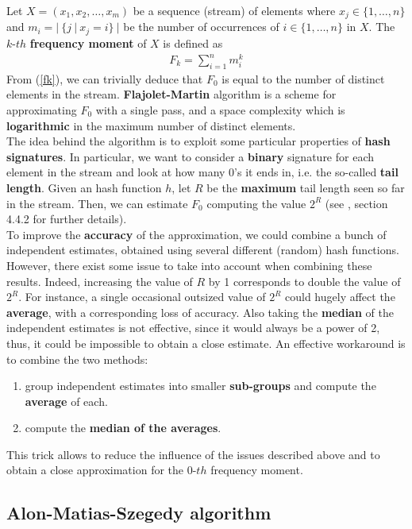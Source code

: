 Let $X = (x_1, x_2, \ldots, x_m)$ be a sequence (stream) of elements where $x_j \in \{1,\ldots,n\}$ and $m_i = |\ \{j \ | \ x_j = i\}\ |$ be the number of occurrences of $i \in \{1,\ldots,n\}$ in $X$.
The $k\text{-}th$ \textbf{frequency moment} of $X$ is defined as
\begin{align}
	F_k = \sum_{i = 1}^{n} m_{i}^k \label{fk}
\end{align}
From (\ref{fk}), we can trivially deduce that $F_0$ is equal to the number of distinct elements in the stream. \textbf{Flajolet-Martin}\cite{fm} algorithm is a scheme for approximating $F_0$ with a single pass, and a space complexity which is \textbf{logarithmic} in the maximum number of distinct elements.\\
The idea behind the algorithm is to exploit some particular properties of \textbf{hash signatures}. In particular, we want to consider a \textbf{binary} signature for each element in the stream and look at how many 0's it ends in, i.e. the so-called \textbf{tail length}. Given an hash function $h$, let $R$ be the \textbf{maximum} tail length seen so far in the stream. Then, we can estimate $F_0$ computing the value $2^R$ (see \cite{mmd}, section 4.4.2 for further details).\\
To improve the \textbf{accuracy} of the approximation, we could combine a bunch of independent estimates, obtained using several different (random) hash functions. However, there exist some issue to take into account when combining these results. Indeed, increasing the value of $R$ by 1 corresponds to double the value of $2^R$. For instance, a single occasional outsized value of $2^R$ could hugely affect the \textbf{average}, with a corresponding loss of accuracy. Also taking the \textbf{median} of the independent estimates is not effective, since it would always be a power of 2, thus, it could be impossible to obtain a close estimate. An effective workaround is to combine the two methods:
\begin{enumerate}
	\item group independent estimates into smaller \textbf{sub-groups} and compute the \textbf{average} of each.
	
	\item compute the \textbf{median of the averages}.
\end{enumerate}
This trick allows to reduce the influence of the issues described above and to obtain a close approximation for the $0\text{-}th$ frequency moment.


\subsection{Alon-Matias-Szegedy algorithm}

